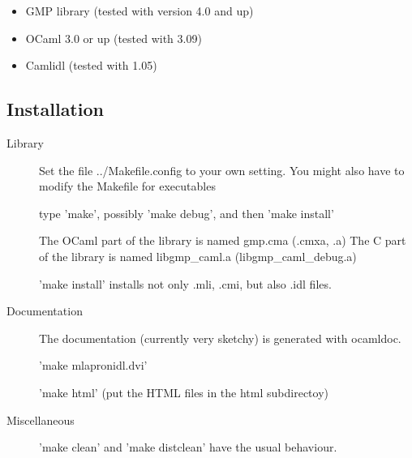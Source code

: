 \documentclass[[twoside,10pt,a4paper]{report}
\begin{document}
\begin{itemize}
\item GMP library (tested with version 4.0 and up)
\item OCaml 3.0 or up (tested with 3.09)
\item Camlidl (tested with 1.05)
\end{itemize}

\subsection*{Installation}

\begin{description}
\item[Library]
Set the file ../Makefile.config to your own setting.
You might also have to modify the Makefile for executables

type 'make', possibly 'make debug', and then 'make install'

The OCaml part of the library is named gmp.cma (.cmxa, .a)
The C part of the library is named libgmp\_caml.a (libgmp\_caml\_debug.a)

'make install' installs not only .mli, .cmi, but also .idl files.

\item[Documentation]
The documentation (currently very sketchy) is generated with ocamldoc.

'make mlapronidl.dvi'

'make html' (put the HTML files in the html subdirectoy)

\item[Miscellaneous]
'make clean' and 'make distclean' have the usual behaviour.
\end{description}

\newpage

\tableofcontents



\appendix
\printindex
\end{document}
